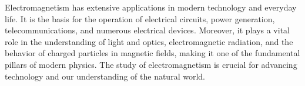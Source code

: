 Electromagnetism has extensive applications in modern technology and everyday life. It is the basis for the operation of electrical circuits, power generation, telecommunications, and numerous electrical devices. Moreover, it plays a vital role in the understanding of light and optics, electromagnetic radiation, and the behavior of charged particles in magnetic fields, making it one of the fundamental pillars of modern physics. The study of electromagnetism is crucial for advancing technology and our understanding of the natural world.

















%




%














